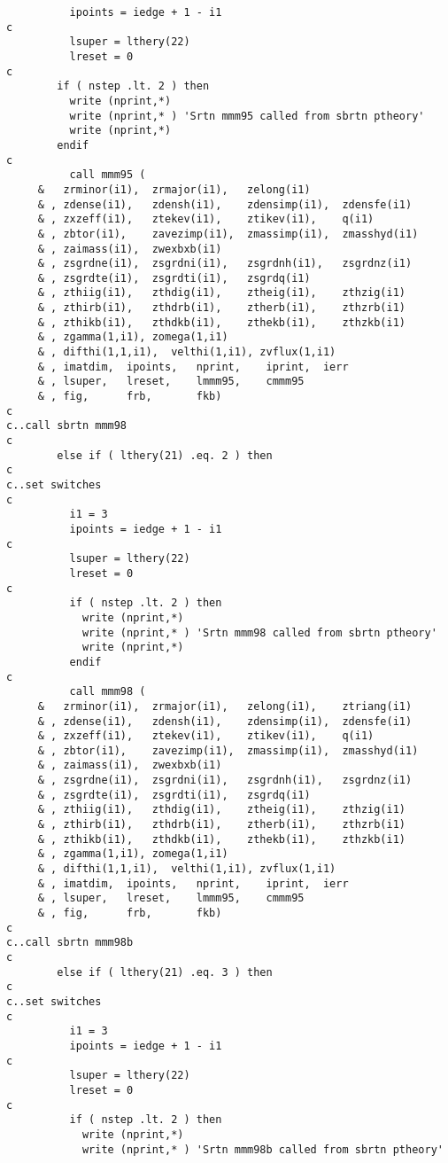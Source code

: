 \begin{verbatim}
          ipoints = iedge + 1 - i1
c
          lsuper = lthery(22)
          lreset = 0
c
        if ( nstep .lt. 2 ) then
          write (nprint,*)
          write (nprint,* ) 'Srtn mmm95 called from sbrtn ptheory'
          write (nprint,*)
        endif
c
          call mmm95 (
     &   zrminor(i1),  zrmajor(i1),   zelong(i1)
     & , zdense(i1),   zdensh(i1),    zdensimp(i1),  zdensfe(i1)
     & , zxzeff(i1),   ztekev(i1),    ztikev(i1),    q(i1)
     & , zbtor(i1),    zavezimp(i1),  zmassimp(i1),  zmasshyd(i1)
     & , zaimass(i1),  zwexbxb(i1)
     & , zsgrdne(i1),  zsgrdni(i1),   zsgrdnh(i1),   zsgrdnz(i1)
     & , zsgrdte(i1),  zsgrdti(i1),   zsgrdq(i1)
     & , zthiig(i1),   zthdig(i1),    ztheig(i1),    zthzig(i1)
     & , zthirb(i1),   zthdrb(i1),    ztherb(i1),    zthzrb(i1)
     & , zthikb(i1),   zthdkb(i1),    zthekb(i1),    zthzkb(i1)
     & , zgamma(1,i1), zomega(1,i1)
     & , difthi(1,1,i1),  velthi(1,i1), zvflux(1,i1)
     & , imatdim,  ipoints,   nprint,    iprint,  ierr
     & , lsuper,   lreset,    lmmm95,    cmmm95
     & , fig,      frb,       fkb)
c
c..call sbrtn mmm98
c
        else if ( lthery(21) .eq. 2 ) then
c
c..set switches
c
          i1 = 3
          ipoints = iedge + 1 - i1
c
          lsuper = lthery(22)
          lreset = 0
c
          if ( nstep .lt. 2 ) then
            write (nprint,*)
            write (nprint,* ) 'Srtn mmm98 called from sbrtn ptheory'
            write (nprint,*)
          endif
c
          call mmm98 (
     &   zrminor(i1),  zrmajor(i1),   zelong(i1),    ztriang(i1)
     & , zdense(i1),   zdensh(i1),    zdensimp(i1),  zdensfe(i1)
     & , zxzeff(i1),   ztekev(i1),    ztikev(i1),    q(i1)
     & , zbtor(i1),    zavezimp(i1),  zmassimp(i1),  zmasshyd(i1)
     & , zaimass(i1),  zwexbxb(i1)
     & , zsgrdne(i1),  zsgrdni(i1),   zsgrdnh(i1),   zsgrdnz(i1)
     & , zsgrdte(i1),  zsgrdti(i1),   zsgrdq(i1)
     & , zthiig(i1),   zthdig(i1),    ztheig(i1),    zthzig(i1)
     & , zthirb(i1),   zthdrb(i1),    ztherb(i1),    zthzrb(i1)
     & , zthikb(i1),   zthdkb(i1),    zthekb(i1),    zthzkb(i1)
     & , zgamma(1,i1), zomega(1,i1)
     & , difthi(1,1,i1),  velthi(1,i1), zvflux(1,i1)
     & , imatdim,  ipoints,   nprint,    iprint,  ierr
     & , lsuper,   lreset,    lmmm95,    cmmm95
     & , fig,      frb,       fkb)
c
c..call sbrtn mmm98b
c
        else if ( lthery(21) .eq. 3 ) then
c
c..set switches
c
          i1 = 3
          ipoints = iedge + 1 - i1
c
          lsuper = lthery(22)
          lreset = 0
c
          if ( nstep .lt. 2 ) then
            write (nprint,*)
            write (nprint,* ) 'Srtn mmm98b called from sbrtn ptheory'

\end{verbatim}
